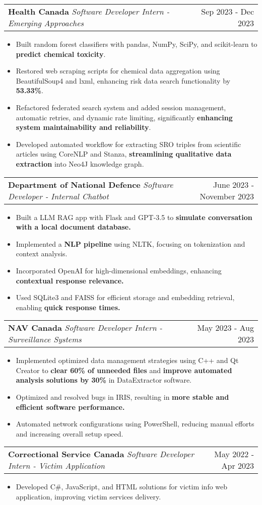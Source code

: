 \documentclass[letterpaper,11pt]{article}
\makeatletter
\newcommand{\resumeItem}[1]{
  \item\small{
    {#1 \vspace{-2pt}}
  }
}
\newcommand{\resumeSubheading}[3]{
    \item
    \begin{tabular*}{0.97\textwidth}[t]{l@{\extracolsep{\fill}}r}
      \textbf{#1} \textbar \textit{ #2} & #3 \\
    \end{tabular*}\vspace{-4.5pt}
}
\newcommand{\resumeItemListStart}{\begin{itemize}}
\newcommand{\resumeItemListEnd}{\end{itemize}\vspace{-5pt}}
\makeatother
\begin{document}
    \resumeSubheading
      {Health Canada}{Software Developer Intern - Emerging Approaches}{Sep 2023 - Dec 2023}
      \resumeItemListStart
        \resumeItem{Built random forest classifiers with pandas, NumPy, SciPy, and scikit-learn to \textbf{predict chemical toxicity}.}
        \resumeItem{Restored web scraping scripts for chemical data aggregation using BeautifulSoup4 and lxml, enhancing risk data search functionality by \textbf{53.33\%}.}
        \resumeItem{Refactored federated search system and added session management, automatic retries, and dynamic rate limiting, significantly \textbf{enhancing system maintainability and reliability}.}
        \resumeItem{Developed automated workflow for extracting SRO triples from scientific articles using CoreNLP and Stanza, \textbf{streamlining qualitative data extraction} into Neo4J knowledge graph.}
      \resumeItemListEnd

    \resumeSubheading
    {Department of National Defence}{Software Developer - Internal Chatbot}{June 2023 - November 2023}
      \resumeItemListStart
        \resumeItem{Built a LLM RAG app with Flask and GPT-3.5 to \textbf{simulate conversation with a local document database.}}
        \resumeItem{Implemented a \textbf{NLP pipeline} using NLTK, focusing on tokenization and context analysis.}
        \resumeItem{Incorporated OpenAI for high-dimensional embeddings, enhancing \textbf{contextual response relevance.}}
        \resumeItem{Used SQLite3 and FAISS for efficient storage and embedding retrieval, enabling \textbf{quick response times.}}
      \resumeItemListEnd

    \resumeSubheading
    {NAV Canada}{Software Developer Intern - Surveillance Systems}{May 2023 - Aug 2023}
      \resumeItemListStart
        \resumeItem{Implemented optimized data management strategies using C++ and Qt Creator to \textbf{clear 60\% of unneeded files} and \textbf{improve automated analysis solutions by 30\%} in DataExtractor software.}
        \resumeItem{Optimized and resolved bugs in IRIS, resulting in \textbf{more stable and efficient software performance.}}
        \resumeItem{Automated network configurations using PowerShell, reducing manual efforts and increasing overall setup speed.}
      \resumeItemListEnd

    \resumeSubheading
    {Correctional Service Canada}{Software Developer Intern - Victim Application}{May 2022 - Apr 2023}
      \resumeItemListStart
        \resumeItem{Developed C\#, JavaScript, and HTML solutions for victim info web application, improving victim services delivery.}
      \resumeItemListEnd
\end{document}
